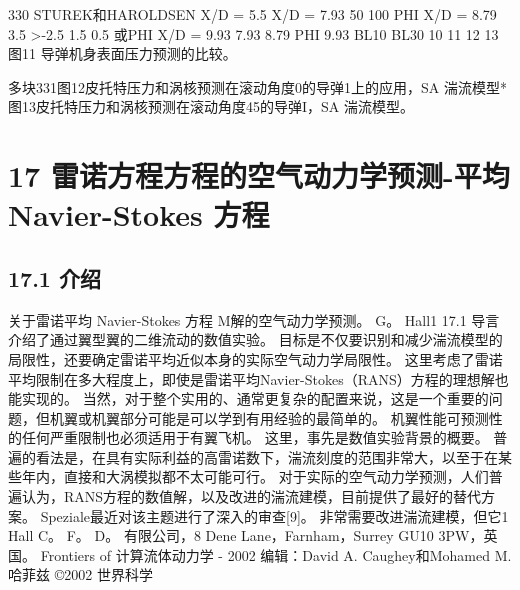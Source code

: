 \documentclass[UTF8,11pt,a4paper,openany,fontset=fandol]{ctexbook}
\begin{document}
330 STUREK和HAROLDSEN X/D = 5.5 X/D = 7.93 50 100 PHI X/D = 8.79 3.5 >-2.5 1.5 0.5 或PHI X/D = 9.93 7.93 8.79 PHI 9.93 BL10 BL30 10 11 12 13 图11 导弹机身表面压力预测的比较。

多块331图12皮托特压力和涡核预测在滚动角度0的导弹1上的应用，SA 湍流模型*图13皮托特压力和涡核预测在滚动角度45的导弹I，SA 湍流模型。

\clearpage
\chapter{17 雷诺方程方程的空气动力学预测-平均Navier-Stokes 方程}
\section{17.1 介绍}
关于雷诺平均 Navier-Stokes 方程 M解的空气动力学预测。 G。 Hall1 17.1 导言 介绍了通过翼型翼的二维流动的数值实验。 目标是不仅要识别和减少湍流模型的局限性，还要确定雷诺平均近似本身的实际空气动力学局限性。 这里考虑了雷诺平均限制在多大程度上，即使是雷诺平均Navier-Stokes（RANS）方程的理想解也能实现的。 当然，对于整个实用的、通常更复杂的配置来说，这是一个重要的问题，但机翼或机翼部分可能是可以学到有用经验的最简单的。 机翼性能可预测性的任何严重限制也必须适用于有翼飞机。 这里，事先是数值实验背景的概要。 普遍的看法是，在具有实际利益的高雷诺数下，湍流刻度的范围非常大，以至于在某些年内，直接和大涡模拟都不太可能可行。 对于实际的空气动力学预测，人们普遍认为，RANS方程的数值解，以及改进的湍流建模，目前提供了最好的替代方案。 Speziale最近对该主题进行了深入的审查[9]。 非常需要改进湍流建模，但它1 Hall C。 F。 D。 有限公司，8 Dene Lane，Farnham，Surrey GU10 3PW，英国。 Frontiers of 计算流体动力学 - 2002 编辑：David A. Caughey和Mohamed M. 哈菲兹 ©2002 世界科学
\end{document}
